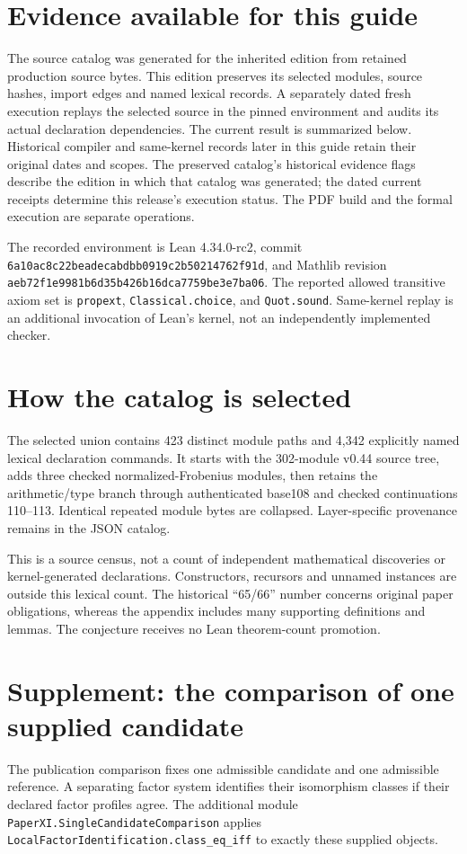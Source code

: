 \documentclass[10pt,oneside]{book}
\begin{document}
\section{Evidence available for this guide}
The source catalog was generated for the inherited edition from retained production source bytes. This edition preserves its selected modules, source hashes, import edges and named lexical records. A separately dated fresh execution replays the selected source in the pinned environment and audits its actual declaration dependencies. The current result is summarized below. Historical compiler and same-kernel records later in this guide retain their original dates and scopes. The preserved catalog's historical evidence flags describe the edition in which that catalog was generated; the dated current receipts determine this release's execution status. The PDF build and the formal execution are separate operations.



The recorded environment is Lean 4.34.0-rc2, commit \nolinkurl{6a10ac8c22beadecabdbb0919c2b50214762f91d}, and Mathlib revision \nolinkurl{aeb72f1e9981b6d35b426b16dca7759be3e7ba06}. The reported allowed transitive axiom set is \texttt{propext}, \texttt{Classical.choice}, and \texttt{Quot.sound}. Same-kernel replay is an additional invocation of Lean's kernel, not an independently implemented checker.

\section{How the catalog is selected}
The selected union contains 423 distinct module paths and 4,342 explicitly named lexical declaration commands. It starts with the 302-module v0.44 source tree, adds three checked normalized-Frobenius modules, then retains the arithmetic/type branch through authenticated base108 and checked continuations 110--113. Identical repeated module bytes are collapsed. Layer-specific provenance remains in the JSON catalog.

This is a source census, not a count of independent mathematical discoveries or kernel-generated declarations. Constructors, recursors and unnamed instances are outside this lexical count. The historical ``65/66'' number concerns original paper obligations, whereas the appendix includes many supporting definitions and lemmas. The conjecture receives no Lean theorem-count promotion.

\clearpage
\section{Supplement: the comparison of one supplied candidate}
The publication comparison fixes one admissible candidate and one admissible reference. A separating factor system identifies their isomorphism classes if their declared factor profiles agree. The additional module \nolinkurl{PaperXI.SingleCandidateComparison} applies \nolinkurl{LocalFactorIdentification.class_eq_iff} to exactly these supplied objects.
\end{document}
